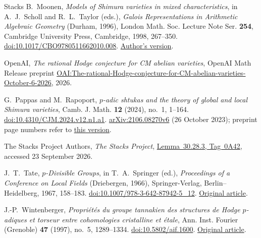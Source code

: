 \begin{thebibliography}{Stacks}
B.~Moonen,
\emph{Models of Shimura varieties in mixed characteristics},
in A.~J.~Scholl and R.~L.~Taylor (eds.),
\emph{Galois Representations in Arithmetic Algebraic Geometry}
(Durham, 1996), London Math. Soc. Lecture Note Ser. \textbf{254},
Cambridge University Press, Cambridge, 1998, 267--350.
\href{https://doi.org/10.1017/CBO9780511662010.008}{doi:10.1017/CBO9780511662010.008}.
\href{https://www.math.ru.nl/personal/bmoonen/Papers/SMCfinal.pdf}{Author's version}.

OpenAI,
\emph{The rational Hodge conjecture for CM abelian varieties},\newline
OpenAI Math Release preprint
\href{https://github.com/openai/math/blob/main/preprints/The-rational-Hodge-conjecture-for-CM-abelian-varieties-October-6-2026/paper.pdf}{OAI:The-rational-Hodge-conjecture-for-CM-abelian-varieties-October-6-2026},
2026.

G.~Pappas and M.~Rapoport,
\emph{$p$-adic shtukas and the theory of global and local Shimura varieties},
Camb. J. Math. \textbf{12} (2024), no.~1, 1--164.
\href{https://doi.org/10.4310/CJM.2024.v12.n1.a1}{doi:10.4310/CJM.2024.v12.n1.a1}.
\href{https://arxiv.org/abs/2106.08270v6}{arXiv:2106.08270v6}
(26 October 2023); preprint page numbers refer to
\href{https://arxiv.org/pdf/2106.08270v6}{this version}.

The Stacks Project Authors,
\emph{The Stacks Project},
\href{https://stacks.math.columbia.edu/tag/0A42}{Lemma~30.28.3, Tag~0A42},
accessed 23 September 2026.

J.~T.~Tate,
\emph{$p$-Divisible Groups},
in T.~A.~Springer (ed.), \emph{Proceedings of a Conference on Local Fields}
(Driebergen, 1966), Springer-Verlag, Berlin--Heidelberg, 1967, 158--183.
\href{https://doi.org/10.1007/978-3-642-87942-5_12}{doi:10.1007/978-3-642-87942-5\_12}.
\href{https://www.math.purdue.edu/~tongliu/teaching/598/p-divisible.pdf}{Original article}.

J.-P.~Wintenberger,
\emph{Propri\'et\'es du groupe tannakien des structures de Hodge $p$-adiques
et torseur entre cohomologies cristalline et \'etale},
Ann. Inst. Fourier (Grenoble) \textbf{47} (1997), no.~5, 1289--1334.
\href{https://doi.org/10.5802/aif.1600}{doi:10.5802/aif.1600}.
\href{https://www.numdam.org/item/10.5802/aif.1600.pdf}{Original article}.

\end{thebibliography}
